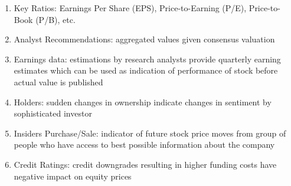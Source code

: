 \begin{definition} 
\begin{enumerate}[label=\roman*.]
\setlength{\itemsep}{0pt}
\item Key Ratios: Earnings Per Share (EPS), Price-to-Earning (P/E), Price-to-Book (P/B), etc. 
\item Analyst Recommendations: aggregated values given consensus valuation
\item Earnings data: estimations by research analysts provide quarterly earning estimates which can be used as indication of performance of stock before actual value is published
\item Holders: sudden changes in ownership indicate changes in sentiment by sophisticated investor
\item Insiders Purchase/Sale: indicator of future stock price moves from group of people who have access to best possible information about the company
\item Credit Ratings: credit downgrades resulting in higher funding costs have negative impact on equity prices
\end{enumerate}
\end{definition}